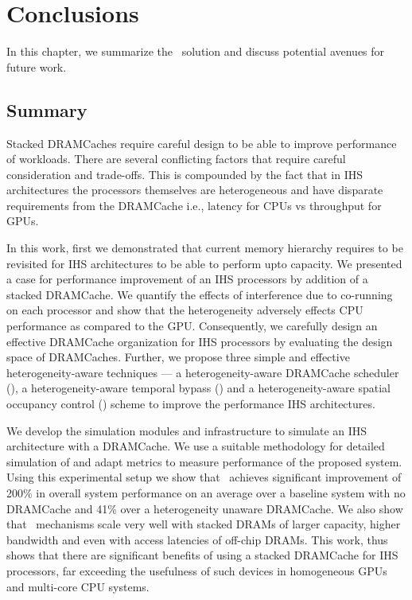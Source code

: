 \chapter{Conclusions} \label{chap:conclusion}
In this chapter, we summarize the \cachename\ solution and discuss potential avenues for future work.
\section{Summary}
Stacked DRAMCaches require careful design to be able to improve performance of workloads. There are several conflicting factors that require careful consideration and trade-offs. This is compounded by the fact that in IHS architectures the processors themselves are  heterogeneous and have disparate requirements from the DRAMCache i.e., latency for CPUs vs throughput for GPUs.
\par In this work, first we demonstrated that current memory hierarchy requires to be revisited for IHS architectures to be able to perform upto capacity. We presented a case for performance improvement of an IHS processors by addition of a stacked DRAMCache. 
We quantify the effects of interference due to co-running on each processor and show that the heterogeneity adversely effects CPU performance as compared to the GPU. 
Consequently, we carefully design an effective DRAMCache organization for IHS processors by evaluating the design space of DRAMCaches.
Further, we propose three simple and effective heterogeneity-aware techniques --- a heterogeneity-aware DRAMCache scheduler (\prioname), a heterogeneity-aware temporal bypass (\bypassname) and a heterogeneity-aware spatial occupancy control (\chaining) scheme to improve the performance IHS architectures.
\par We develop the simulation modules and infrastructure to simulate an IHS architecture with a DRAMCache. We use a suitable methodology for detailed simulation of \cachename and adapt metrics to measure performance of the proposed system. Using this experimental setup we show that 
\cachename\ achieves significant improvement of 200\% in overall system performance on an average over a baseline system with no DRAMCache and 41\% over a heterogeneity unaware DRAMCache. 
We also show that \cachename\ mechanisms scale very well with stacked DRAMs of larger capacity, higher bandwidth and even with access latencies of off-chip DRAMs.
This work, thus shows that there are significant benefits of using a stacked DRAMCache for IHS processors, far exceeding the usefulness of such devices in homogeneous GPUs and multi-core CPU systems.

